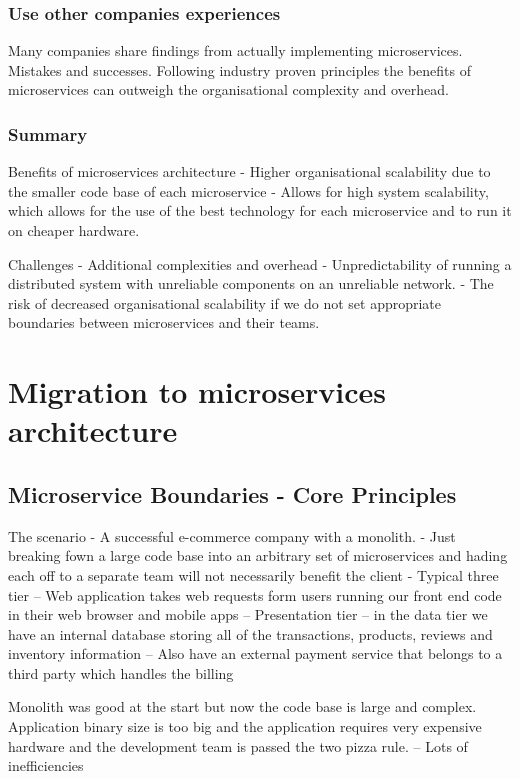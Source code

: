 \documentclass[a4paper, 11pt]{book}
\begin{document}
    \subsubsection{Use other companies experiences}
    Many companies share findings from actually implementing microservices. Mistakes and successes.
    Following industry proven principles the benefits of microservices can outweigh the organisational complexity and overhead.

    \subsubsection{Summary}
    Benefits of microservices architecture
    - Higher organisational scalability due to the smaller code base of each microservice
    - Allows for high system scalability, which allows for the use of the best technology for each microservice and to run it on cheaper hardware.

    Challenges
    - Additional complexities and overhead
    - Unpredictability of running a distributed system with unreliable components on an unreliable network.
    - The risk of decreased organisational scalability if we do not set appropriate boundaries between microservices and their teams.

    \section{Migration to microservices architecture}

    \subsection{Microservice Boundaries - Core Principles}
    The scenario - A successful e-commerce company with a monolith.
    - Just breaking fown a large code base into an arbitrary set of microservices and hading each off to a separate team will not necessarily benefit the client
    - Typical three tier
    -- Web application takes web requests form users running our front end code in their web browser and mobile apps -- Presentation tier
    -- in the data tier we have an internal database storing all of the transactions, products, reviews and inventory information
    -- Also have an external payment service that belongs to a third party which handles the billing

    Monolith was good at the start but now the code base is large and complex.
    Application binary size is too big and the application requires very expensive hardware and the development team is passed the two pizza rule.
    -- Lots of inefficiencies
\end{document}
